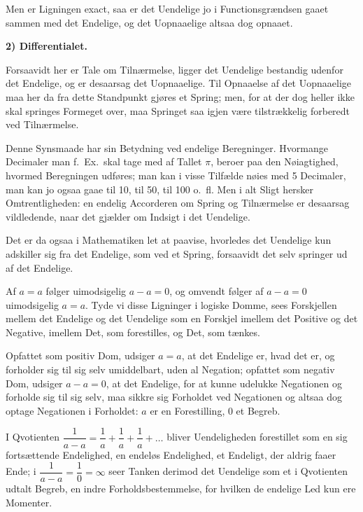 \documentclass[12pt]{book}
\newcommand{\opage}[1]{\marginnote{\footnotesize\textit{[#1]}}}
\begin{document}
Men er Ligningen exact, saa er det Uendelige jo i Functionsgrændsen gaaet sammen
med det Endelige, og det Uopnaaelige altsaa dog opnaaet.

\begin{center}
\textbf{2) Differentialet.}
\end{center}
{}

Forsaavidt her er Tale om Tilnærmelse, ligger det Uendelige bestandig udenfor det
Endelige, og er desaarsag
\opage{53} det Uopnaaelige. Til Opnaaelse af det Uopnaaelige maa her da fra dette Standpunkt
gjøres et Spring; men, for at der dog heller ikke skal springes Formeget over, maa
Springet saa igjen være tilstrækkelig forberedt ved Tilnærmelse.

Denne Synsmaade har sin Betydning ved endelige Beregninger. Hvormange Decimaler
man f.\ Ex.\ skal tage med af Tallet $\pi$, beroer paa den Nøiagtighed, hvormed
Beregningen udføres; man kan i visse Tilfælde nøies med 5 Decimaler, man kan jo
ogsaa gaae til 10, til 50, til 100 o.\ fl. Men i alt Sligt hersker
Omtrentligheden: en endelig Accorderen om Spring og Tilnærmelse er desaarsag
vildledende, naar det gjælder om Indsigt i det Uendelige.

Det er da ogsaa i Mathematiken let at paavise, hvorledes det Uendelige kun
adskiller sig fra det Endelige, som ved et Spring, forsaavidt det selv springer ud
af det Endelige.

Af $a = a$ følger uimodsigelig $a - a = 0$, og omvendt følger af $a - a = 0$
uimodsigelig $a = a$. Tyde vi disse Ligninger i logiske Domme, sees Forskjellen
mellem det Endelige og det Uendelige som en Forskjel imellem det Positive og det
Negative, imellem Det, som forestilles, og Det, som tænkes.

Opfattet som positiv Dom, udsiger $a = a$, at det Endelige er, hvad det er, og
forholder sig til sig selv umiddelbart, uden al Negation; opfattet som negativ Dom,
udsiger $a - a = 0$, at det Endelige, for at kunne udelukke Negationen og forholde
sig til sig selv, maa sikkre sig Forholdet ved Negationen og altsaa dog optage
Negationen i Forholdet: $a$ er en Forestilling, 0 et Begreb.

I Qvotienten $\dfrac{1}{a-a} = \dfrac{1}{a} + \dfrac{1}{a} + \dfrac{1}{a} + \dots$
bliver Uendeligheden forestillet som en sig fortsættende Endelighed, en endeløs
Endelighed, et Endeligt, der aldrig faaer Ende; i
$\dfrac{1}{a-a} = \dfrac{1}{0} = \infty$ seer Tanken derimod det
\opage{54} Uendelige som et i Qvotienten udtalt Begreb, en indre Forholdsbestemmelse, for
hvilken de endelige Led kun ere Momenter.
\end{document}
